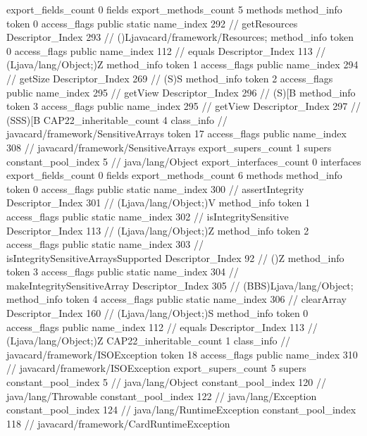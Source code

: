 {{{			export_fields_count	0
			fields {
			}
			export_methods_count	5
			methods {
				method_info {
					token	0
					access_flags	public static
					name_index	292		// getResources
					Descriptor_Index	293		// ()Ljavacard/framework/Resources;
				}
				method_info {
					token	0
					access_flags	public
					name_index	112		// equals
					Descriptor_Index	113		// (Ljava/lang/Object;)Z
				}
				method_info {
					token	1
					access_flags	public
					name_index	294		// getSize
					Descriptor_Index	269		// (S)S
				}
				method_info {
					token	2
					access_flags	public
					name_index	295		// getView
					Descriptor_Index	296		// (S)[B
				}
				method_info {
					token	3
					access_flags	public
					name_index	295		// getView
					Descriptor_Index	297		// (SSS)[B
				}
			}
			CAP22_inheritable_count	4
		}
		class_info {		// javacard/framework/SensitiveArrays
			token	17
			access_flags	public
			name_index	308		// javacard/framework/SensitiveArrays
			export_supers_count	1
			supers {
				constant_pool_index	5		// java/lang/Object
			}
			export_interfaces_count	0
			interfaces {
			}
			export_fields_count	0
			fields {
			}
			export_methods_count	6
			methods {
				method_info {
					token	0
					access_flags	public static
					name_index	300		// assertIntegrity
					Descriptor_Index	301		// (Ljava/lang/Object;)V
				}
				method_info {
					token	1
					access_flags	public static
					name_index	302		// isIntegritySensitive
					Descriptor_Index	113		// (Ljava/lang/Object;)Z
				}
				method_info {
					token	2
					access_flags	public static
					name_index	303		// isIntegritySensitiveArraysSupported
					Descriptor_Index	92		// ()Z
				}
				method_info {
					token	3
					access_flags	public static
					name_index	304		// makeIntegritySensitiveArray
					Descriptor_Index	305		// (BBS)Ljava/lang/Object;
				}
				method_info {
					token	4
					access_flags	public static
					name_index	306		// clearArray
					Descriptor_Index	160		// (Ljava/lang/Object;)S
				}
				method_info {
					token	0
					access_flags	public
					name_index	112		// equals
					Descriptor_Index	113		// (Ljava/lang/Object;)Z
				}
			}
			CAP22_inheritable_count	1
		}
		class_info {		// javacard/framework/ISOException
			token	18
			access_flags	public
			name_index	310		// javacard/framework/ISOException
			export_supers_count	5
			supers {
				constant_pool_index	5		// java/lang/Object
				constant_pool_index	120		// java/lang/Throwable
				constant_pool_index	122		// java/lang/Exception
				constant_pool_index	124		// java/lang/RuntimeException
				constant_pool_index	118		// javacard/framework/CardRuntimeException
}}}}
